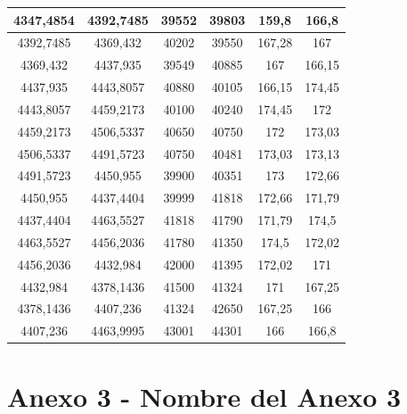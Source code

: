 \documentclass[12pt,letter,spanish]{article}
\begin{document}
\begin{table}[H]
\begin{tabular}{|c|c|c|c|c|c|}
4347,4854 & 4392,7485 & 39552 & 39803 & 159,8  & 166,8  \\ \hline
4392,7485 & 4369,432  & 40202 & 39550 & 167,28 & 167    \\ \hline
4369,432  & 4437,935  & 39549 & 40885 & 167    & 166,15 \\ \hline
4437,935  & 4443,8057 & 40880 & 40105 & 166,15 & 174,45 \\ \hline
4443,8057 & 4459,2173 & 40100 & 40240 & 174,45 & 172    \\ \hline
4459,2173 & 4506,5337 & 40650 & 40750 & 172    & 173,03 \\ \hline
4506,5337 & 4491,5723 & 40750 & 40481 & 173,03 & 173,13 \\ \hline
4491,5723 & 4450,955  & 39900 & 40351 & 173    & 172,66 \\ \hline
4450,955  & 4437,4404 & 39999 & 41818 & 172,66 & 171,79 \\ \hline
4437,4404 & 4463,5527 & 41818 & 41790 & 171,79 & 174,5  \\ \hline
4463,5527 & 4456,2036 & 41780 & 41350 & 174,5  & 172,02 \\ \hline
4456,2036 & 4432,984  & 42000 & 41395 & 172,02 & 171    \\ \hline
4432,984  & 4378,1436 & 41500 & 41324 & 171    & 167,25 \\ \hline
4378,1436 & 4407,236  & 41324 & 42650 & 167,25 & 166    \\ \hline
4407,236  & 4463,9995 & 43001 & 44301 & 166    & 166,8  \\ \hline
\end{tabular}
\centering
\end{table}
\newpage

\section*{\centering Anexo 3 - Nombre del Anexo 3}
 
\end{document}
